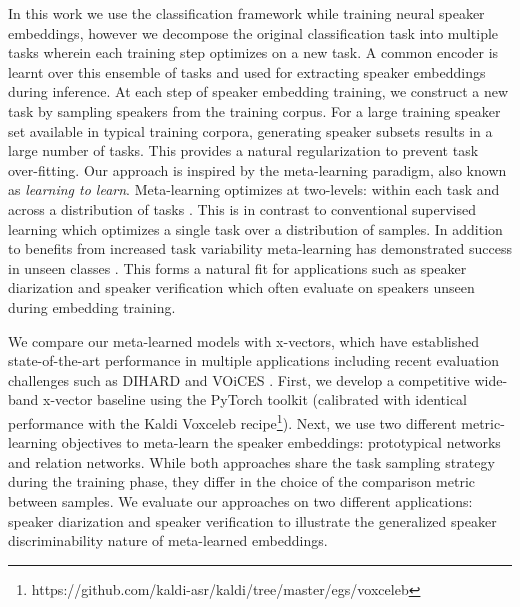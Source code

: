 In this work we use the classification framework while training neural speaker embeddings, however we decompose the original classification task into multiple tasks wherein each training step optimizes on a new task. 
A common encoder is learnt over this ensemble of tasks and used for extracting speaker embeddings during inference.
At each step of speaker embedding training, we construct a new task by sampling speakers from the training corpus. For a large training speaker set available in typical training corpora,
generating speaker subsets results in a large number of tasks.
This provides a natural regularization to prevent task over-fitting. 
Our approach is inspired by the meta-learning \cite{Schmidhuber_thesis} paradigm, also known as {\it learning to learn}. Meta-learning optimizes at two-levels: within each task and across a distribution of tasks \cite{ravi2017}. This is in contrast to conventional supervised learning which optimizes a single task over a distribution of samples. 
In addition to benefits from increased task variability meta-learning has demonstrated success in unseen classes \cite{ravi2017, finn_maml2017,Andrychowicz_2016}.
This forms a natural fit for applications such as speaker diarization and speaker verification which often evaluate on speakers unseen during embedding training.

We compare our meta-learned models with x-vectors, which have established state-of-the-art performance in multiple applications \cite{snyder_xvec2017, snyder_xvec2018} including recent evaluation challenges such as DIHARD\cite{Sell2018_dihard} and VOiCES \cite{richey2018voices}. 
First, we develop a competitive wide-band x-vector baseline using the PyTorch toolkit (calibrated with identical performance with the Kaldi Voxceleb recipe\footnote{https://github.com/kaldi-asr/kaldi/tree/master/egs/voxceleb}). 
Next, we use two different metric-learning objectives to meta-learn the speaker embeddings: prototypical networks and relation networks. While both approaches share the task sampling strategy during the training phase, they differ in the choice of the comparison metric between samples. We evaluate our approaches on two different applications: speaker diarization and speaker verification to illustrate the generalized speaker discriminability nature of meta-learned embeddings. 

